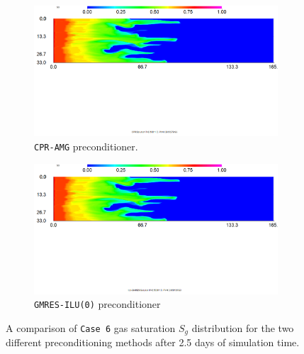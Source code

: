 \begin{figure}[h!]
\centering
\begin{subfigure}{.5\textwidth}
  \centering
  \includegraphics[width=1\linewidth]{figures/case6_cpr_sg.png}
  \caption{\texttt{CPR-AMG} preconditioner.}
\end{subfigure}%
\begin{subfigure}{.5\textwidth}
  \centering
  \includegraphics[width=1\linewidth]{figures/case6_ilu_sg.png}
  \caption{\texttt{GMRES-ILU(0)} preconditioner}
\end{subfigure}
\caption{A comparison of \texttt{Case 6} gas saturation $S_{g}$ distribution for the two different preconditioning methods after 2.5 days of simulation time.}
\label{viscoussg}
\end{figure}

